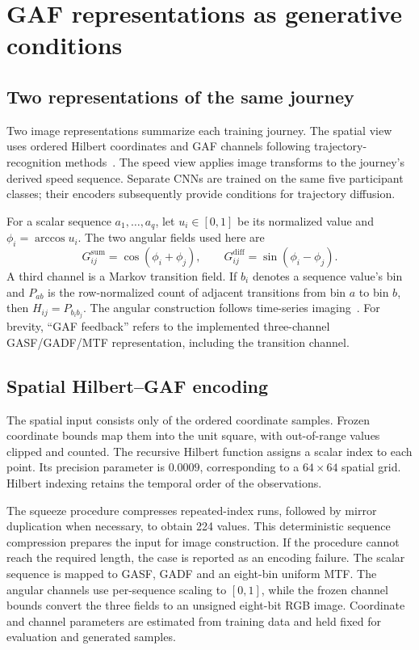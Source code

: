\chapter{GAF representations as generative conditions}
\label{ch:native-feedback}

\section{Two representations of the same journey}
Two image representations summarize each training journey. The spatial view uses ordered Hilbert coordinates and GAF channels following trajectory-recognition methods~\cite{salvadori,ferreira,original}. The speed view applies image transforms to the journey's derived speed sequence. Separate CNNs are trained on the same five participant classes; their encoders subsequently provide conditions for trajectory diffusion.

For a scalar sequence $a_1,\ldots,a_q$, let $u_i\in[0,1]$ be its normalized value and $\phi_i=\arccos u_i$. The two angular fields used here are
\begin{equation}
 G^{\mathrm{sum}}_{ij}=\cos(\phi_i+\phi_j),\qquad
 G^{\mathrm{diff}}_{ij}=\sin(\phi_i-\phi_j).
 \label{eq:native-gaf}
\end{equation}
A third channel is a Markov transition field. If $b_i$ denotes a sequence value's bin and $P_{ab}$ is the row-normalized count of adjacent transitions from bin $a$ to bin $b$, then $H_{ij}=P_{b_i b_j}$. The angular construction follows time-series imaging~\cite{wang}. For brevity, ``GAF feedback'' refers to the implemented three-channel GASF/GADF/MTF representation, including the transition channel.

\section{Spatial Hilbert--GAF encoding}
The spatial input consists only of the ordered coordinate samples. Frozen coordinate bounds map them into the unit square, with out-of-range values clipped and counted. The recursive Hilbert function assigns a scalar index to each point. Its precision parameter is $0.0009$, corresponding to a $64\times64$ spatial grid. Hilbert indexing retains the temporal order of the observations.

The squeeze procedure compresses repeated-index runs, followed by mirror duplication when necessary, to obtain 224 values. This deterministic sequence compression prepares the input for image construction. If the procedure cannot reach the required length, the case is reported as an encoding failure. The scalar sequence is mapped to GASF, GADF and an eight-bin uniform MTF. The angular channels use per-sequence scaling to $[0,1]$, while the frozen channel bounds convert the three fields to an unsigned eight-bit RGB image. Coordinate and channel parameters are estimated from training data and held fixed for evaluation and generated samples.

